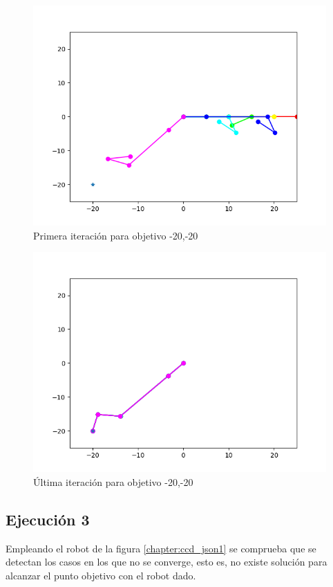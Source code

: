 \begin{figure}[htb]
   \centering
   \includegraphics[width=.8\linewidth]{images/ccd_7.png}
   \caption{Primera iteración para objetivo -20,-20}
   \label{chapter:ccd_ejemplo3}
\end{figure}
\begin{figure}[htb]
   \centering
   \includegraphics[width=.8\linewidth]{images/ccd_9.png}
   \caption{Última iteración para objetivo -20,-20}
   \label{chapter:ccd_ejemplo4}
\end{figure}


\subsection{Ejecución 3}
Empleando el robot de la figura \ref{chapter:ccd_json1} se comprueba que se detectan los casos en los que no se converge, esto es, no existe solución para alcanzar el punto objetivo con el robot dado.

